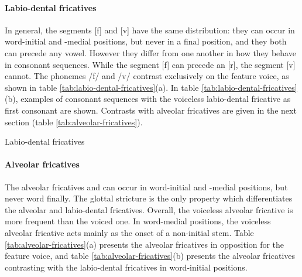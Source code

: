 \paragraph{Labio-dental fricatives}

In general, the segments [f] and [v] have the same distribution: they can occur
in  word-initial and -medial positions, but never in  a final position, and 
they both can precede any vowel. However they differ from one another in how
they behave in consonant sequences. While the segment [f] can precede an [r],
the segment [v] cannot. The phonemes /f/ and /v/ contrast exclusively on the
feature {\sc voice}, as shown in table \ref{tab:labio-dental-fricatives}(a). In
table \ref{tab:labio-dental-fricatives}(b),    examples of consonant sequences
with the voiceless labio-dental fricative as first consonant are shown.
Contrasts with alveolar fricatives are given  in the next section (table
\ref{tab:alveolar-fricatives}).



\begin{table}[!htb]
\centering
\caption{Labio-dental fricatives\label{tab:labio-dental-fricatives}}

\quad
{}


\end{table}




\paragraph{Alveolar fricatives}

The alveolar fricatives {\I [s]} and  {\I [z]} can occur in word-initial and 
-medial positions, but never word finally. The glottal stricture is the only
property which differentiates the alveolar and labio-dental fricatives.
Overall, 
the voiceless alveolar fricative is more frequent than the voiced one. In
word-medial positions,  the voiceless alveolar fricative acts mainly as the
onset
of a non-initial stem. Table
\ref{tab:alveolar-fricatives}(a) presents the alveolar fricatives in 
opposition for the feature {\sc voice},  and table 
\ref{tab:alveolar-fricatives}(b)  presents  the alveolar fricatives contrasting 
with the 
labio-dental fricatives in  word-initial positions.

